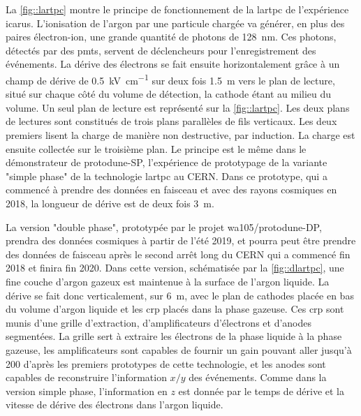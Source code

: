     La \autoref{fig::lartpc} montre le principe de fonctionnement de la \gls{lartpc} de l'expérience \gls{icarus}. L'ionisation de l'argon par une particule chargée va générer, en plus des paires électron-ion, une grande quantité de photons de \SI{128}{\nano\meter}. Ces photons, détectés par des \glspl{pmt}, servent de déclencheurs pour l'enregistrement des événements. La dérive des électrons se fait ensuite horizontalement grâce à un champ de dérive de \SI{0.5}{\kilo\volt\per\centi\meter} sur deux fois \SI{1.5}{\meter} vers le plan de lecture, situé sur chaque côté du volume de détection, la cathode étant au milieu du volume. Un seul plan de lecture est représenté sur la \autoref{fig::lartpc}. Les deux plans de lectures sont constitués de trois plans parallèles de fils verticaux. Les deux premiers lisent la charge de manière non destructive, par induction. La charge est ensuite collectée sur le troisième plan. Le principe est le même dans le démonstrateur de proto\gls{dune}-SP, l'expérience de prototypage de la variante "simple phase" de la technologie \gls{lartpc} au CERN. Dans ce prototype, qui a commencé à prendre des données en faisceau et avec des rayons cosmiques en 2018, la longueur de dérive est de deux fois \SI{3}{\meter}.

    La version "double phase", prototypée par le projet \gls{wa105}/proto\gls{dune}-DP, prendra des données cosmiques à partir de l'été 2019, et pourra peut être prendre des données de faisceau après le second arrêt long du CERN qui a commencé fin 2018 et finira fin 2020. Dans cette version, schématisée par la \autoref{fig::dlartpc}, une fine couche d'argon gazeux est maintenue à la surface de l'argon liquide. La dérive se fait donc verticalement, sur \SI{6}{\meter}, avec le plan de cathodes placée en bas du volume d'argon liquide et les \gls{crp} placés dans la phase gazeuse. Ces \gls{crp} sont munis d'une grille d'extraction, d'amplificateurs d'électrons et d'anodes segmentées. La grille sert à extraire les électrons de la phase liquide à la phase gazeuse, les amplificateurs sont capables de fournir un gain pouvant aller jusqu'à 200 d'après les premiers prototypes de cette technologie\cite{Cantini2014}, et les anodes sont capables de reconstruire l'information $x/y$ des événements. Comme dans la version simple phase, l'information en $z$ est donnée par le temps de dérive et la vitesse de dérive des électrons dans l'argon liquide.

